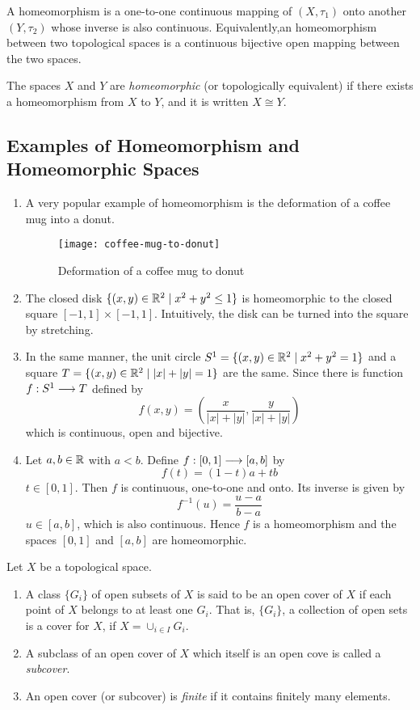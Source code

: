 \begin{defn}[Homeomorphism]
    A homeomorphism is a one-to-one continuous mapping of $(X, \tau_1)$ onto another $(Y, \tau_2)$ whose inverse is also continuous.\newline
    Equivalently,an homeomorphism between two topological spaces is a continuous bijective open mapping between the two spaces.
\end{defn}
The spaces $X$ and $Y$ are \textit{homeomorphic} (or topologically equivalent) if there exists a homeomorphism from $X$ to $Y$, and it is written $X \cong Y$.

\subsection{Examples of Homeomorphism and Homeomorphic Spaces}
\begin{enumerate}
    \item A very popular example of homeomorphism is the deformation of a coffee mug into a donut.
    \begin{figure}[H]
        \centering
        \texttt{[image: coffee-mug-to-donut]}
        \caption{Deformation of a coffee mug to donut}
    \end{figure}
    \item The closed disk $\{(x,y) \in \mathbb{R}^2 \mid x^2 + y^2 \le 1\}$ is homeomorphic to the closed square $[-1,1] \times [-1,1]$. Intuitively, the disk can be turned into the square by stretching.
    \item In the same manner, the unit circle $S^1 = \{(x,y) \in \mathbb{R}^2 \mid x^2 + y^2 = 1\}$ and a square $T = \{(x,y) \in \mathbb{R}^2 \mid |x| + |y| = 1\}$ are the same. Since there is function $f : S^1 \longrightarrow T$ defined by
    \[
        f(x,y) = \left(\frac{x}{|x| + |y|}, \frac{y}{|x| + |y|}\right)  
    \]
    which is continuous, open and bijective.
    \item Let $a,b \in \mathbb{R}$ with $a < b$. Define $f: [0,1] \longrightarrow [a,b]$ by 
    \[
        f(t) = (1-t)a + tb 
    \]
    $t \in [0,1]$. Then $f$ is continuous, one-to-one and onto. Its inverse is given by 
    \[
        f^{-1} (u) = \frac{u-a}{b-a}  
    \]
    $u \in [a,b]$, which is also continuous. Hence $f$ is a homeomorphism and the spaces $[0,1]$ and $[a,b]$ are homeomorphic.

\end{enumerate}

\begin{defn} 
    Let $X$ be a topological space.
    \begin{enumerate}
        \item A class $\{G_i\}$ of open subsets of $X$ is said to be an open cover of $X$ if each point of $X$ belongs to at least one $G_i$. That is, $\{G_i\}$, a collection of open sets is a cover for $X$, if $X = \cup_{i \in I} G_i$.
        \item A subclass of an open cover of $X$ which itself is an open cove is called a \textit{subcover}.
        \item An open cover (or subcover) is \textit{finite} if it contains finitely many elements.
    \end{enumerate}
\end{defn}

